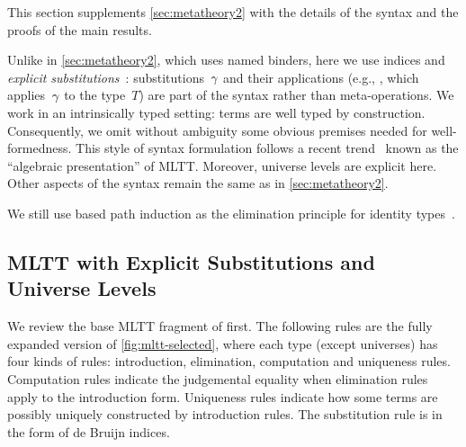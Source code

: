 This section supplements \cref{sec:metatheory2} with the details of the syntax
and the proofs of the main results.

Unlike in \cref{sec:metatheory2}, which uses named binders, here we
use \citeauthor{debruijn1964} indices and \emph{explicit
substitutions}~\cite{abadi1989subst,substcalculus}:
substitutions~$\gamma$ and their applications (e.g., , which
applies~$\gamma$ to the type~$T$) are part of the syntax rather than
meta-operations.
We work in an intrinsically typed setting: terms are well typed by construction.
%
Consequently, we omit without ambiguity some obvious premises needed for well-formedness.
% 
This style of syntax formulation follows a recent
trend~\cite{altkap2016,coquand2018canonicity,gratzer-sterling-birkedal-2019}
known as the ``algebraic presentation'' of MLTT.
Moreover, universe levels are explicit here. Other aspects of the syntax remain the same as in \cref{sec:metatheory2}.

We still use based path induction
as the elimination principle for identity types~\cite{program2013homotopy}.






\subsection{MLTT with Explicit Substitutions and Universe Levels}
\label{sec:mltt-full}

We review the base MLTT fragment of \TT first. The following rules are the fully expanded version of \cref{fig:mltt-selected}, where each type (except universes) has four kinds of rules: introduction, elimination, computation and uniqueness rules. Computation rules indicate the judgemental equality when elimination rules apply to the introduction form. Uniqueness rules indicate how some terms are possibly uniquely constructed by introduction rules. The substitution rule is in the form of de Bruijn indices.

